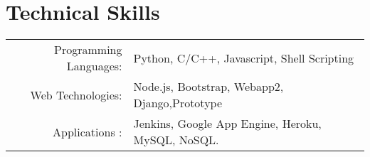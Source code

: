 \section{Technical Skills}
\renewcommand{\arraystretch}{1}%
\begin{tabular}{rl}

Programming Languages: &  Python, C/C++, Javascript, Shell Scripting\\
Web Technologies: & Node.js, Bootstrap, Webapp2, Django,Prototype\\
Applications : & Jenkins, Google App Engine, Heroku, MySQL, NoSQL.\\
\end{tabular}
\vspace{5pt}
